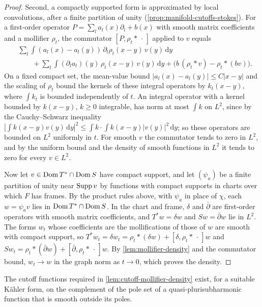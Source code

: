 \begin{proof}
Second, a compactly supported form is approximated by local convolutions, after a finite partition of unity (\cref{prop:manifold-cutoffs-stokes}). For a first-order operator $P=\sum_la_l(x)\partial_l+b(x)$ with smooth matrix coefficients and a mollifier $\rho_t$, the commutator $[P,\rho_t*\,\cdot\,]$ applied to $v$ equals
\[
 \begin{aligned}
 &\sum_l\int(a_l(x)-a_l(y))\,\partial_l\rho_t(x-y)\,v(y)\,\mathrm dy\\
 &\qquad+\sum_l\int(\partial_l a_l)(y)\,\rho_t(x-y)\,v(y)\,\mathrm dy
   +\bigl(b\,(\rho_t*v)-\rho_t*(bv)\bigr).
 \end{aligned}
\]
On a fixed compact set, the mean-value bound $|a_l(x)-a_l(y)|\leq C|x-y|$ and the scaling of $\rho_t$ bound the kernels of these integral operators by $k_t(x-y)$, where $\int k_t$ is bounded independently of $t$. An integral operator with a kernel bounded by $k(x-y)$, $k\geq0$ integrable, has norm at most $\int k$ on $L^2$, since by the Cauchy--Schwarz inequality $|\int k(x-y)v(y)\,\mathrm dy|^2\leq\int k\cdot\int k(x-y)|v(y)|^2\,\mathrm dy$; so these operators are bounded on $L^2$ uniformly in $t$. For smooth $v$ the commutator tends to zero in $L^2$, and by the uniform bound and the density of smooth functions in $L^2$ it tends to zero for every $v\in L^2$.

Now let $v\in\operatorname{Dom} T^*\cap\operatorname{Dom} S$ have compact support, and let $(\psi_a)$ be a finite partition of unity near $\operatorname{Supp} v$ by functions with compact supports in charts over which $F$ has frames. By the product rules above, with $\psi_a$ in place of $\chi$, each $w=\psi_av$ lies in $\operatorname{Dom} T^*\cap\operatorname{Dom} S$. In the chart and frame, $\delta$ and $\bar\partial$ are first-order operators with smooth matrix coefficients, and $T^*w=\delta w$ and $Sw=\bar\partial w$ lie in $L^2$. The forms $w_t$ whose coefficients are the mollifications of those of $w$ are smooth with compact support, so $T^*w_t=\delta w_t=\rho_t*(\delta w)+[\delta,\rho_t*\,\cdot\,]w$ and $Sw_t=\rho_t*(\bar\partial w)+[\bar\partial,\rho_t*\,\cdot\,]w$. By \cref{lem:mollifier-density} and the commutator bound, $w_t\to w$ in the graph norm as $t\to0$, which proves the density.
\end{proof}

The cutoff functions required in \cref{lem:cutoff-mollifier-density} exist, for a suitable K\"ahler form, on the complement of the pole set of a quasi-plurisubharmonic function that is smooth outside its poles.

